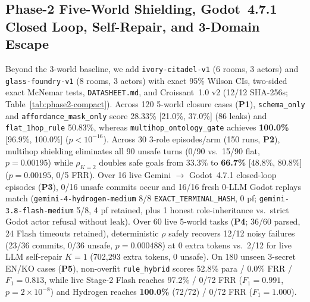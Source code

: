 \subsection{Phase-2 Five-World Shielding, Godot~4.7.1 Closed Loop, Self-Repair, and 3-Domain Escape}\label{sec:phase2-compact}
Beyond the 3-world baseline, we add \texttt{ivory-\allowbreak citadel-\allowbreak v1} (6 rooms, 3 actors) and \texttt{glass-\allowbreak foundry-\allowbreak v1} (8 rooms, 3 actors) with exact 95\% Wilson CIs, two-sided exact McNemar tests, \texttt{DATASHEET.md}, and Croissant~1.0 v2 (12/12 SHA-256s; Table~\ref{tab:phase2-compact}). Across 120 5-world closure cases (\textbf{P1}), \texttt{schema\_only} and \texttt{affordance\_}\allowbreak\texttt{mask\_only} score 28.33\% [21.0\%, 37.0\%] (86 leaks) and \texttt{flat\_}\allowbreak\texttt{1hop\_}\allowbreak\texttt{rule} 50.83\%, whereas \texttt{multihop\_}\allowbreak\texttt{ontology\_}\allowbreak\texttt{gate} achieves \textbf{100.0\%} [96.9\%, 100.0\%] ($p{<}10^{-16}$). Across 30 3-role episodes/arm (150 runs, \textbf{P2}), multihop shielding eliminates all 90 unsafe turns (0/90 vs.\ 15/90 flat, $p{=}0.00195$) while $\rho_{K=2}$ doubles safe goals from 33.3\% to \textbf{66.7\%} [48.8\%, 80.8\%] ($p{=}0.00195$, 0/5 FRR). Over 16 live Gemini $\rightarrow$ Godot~4.7.1 closed-loop episodes (\textbf{P3}), 0/16 unsafe commits occur and 16/16 fresh 0-LLM Godot replays match (\texttt{gemini-4-}\allowbreak\texttt{hydrogen-\allowbreak medium} 8/8 \texttt{EXACT\_}\allowbreak\texttt{TERMINAL\_}\allowbreak\texttt{HASH}, 0 pf; \texttt{gemini-3.8-}\allowbreak\texttt{flash-\allowbreak medium} 5/8, 4 pf retained, plus 1 honest role-inheritance vs.\ strict Godot actor refusal without leak). Over 60 live 5-world tasks (\textbf{P4}; 36/60 parsed, 24 Flash timeouts retained), deterministic $\rho$ safely recovers 12/12 noisy failures (23/36 commits, 0/36 unsafe, $p{=}0.000488$) at 0 extra tokens vs.\ 2/12 for live LLM self-repair $K{=}1$ (702,293 extra tokens, 0 unsafe). On 180 unseen 3-secret EN/KO cases (\textbf{P5}), non-overfit \texttt{rule\_hybrid} scores 52.8\% para / 0.0\% FRR / $F_1{=}0.813$, while live Stage-2 Flash reaches 97.2\% / 0/72 FRR ($F_1{=}0.991$, $p{=}2{\times}10^{-8}$) and Hydrogen reaches \textbf{100.0\%} (72/72) / 0/72 FRR ($F_1{=}1.000$).

